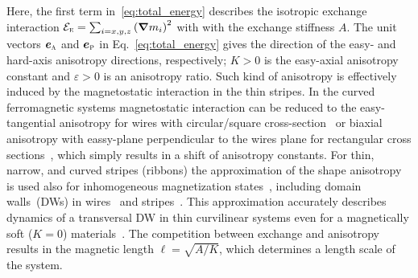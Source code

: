 Here, the first term in~\eqref{eq:total_energy} describes the isotropic exchange interaction $\mathcal{E}_\textsc{e}=\sum_{i=x,y,z}\left(\vec{\nabla} m_i\right)^2$ with with the exchange stiffness $A$. The unit vectors $\vec{e}_\textsc{a}$ and $\vec{e}_\textsc{p}$ in Eq.~\eqref{eq:total_energy} gives the direction of the easy- and hard-axis anisotropy directions, respectively; $K>0$ is the easy-axial anisotropy constant and $\varepsilon>0$ is an anisotropy ratio. Such kind of anisotropy is effectively induced by the magnetostatic interaction in the thin stripes. In the curved ferromagnetic systems magnetostatic interaction can be reduced to the easy-tangential anisotropy for wires with circular/square cross-section~\cite{Slastikov12} or biaxial anisotropy with eassy-plane perpendicular to the wires plane for rectangular cross sections~\cite{Aharoni98,Gaididei17a}, which simply results in a shift of anisotropy constants. For thin, narrow, and curved stripes (ribbons) the approximation of the shape anisotropy is used also for inhomogeneous magnetization states~\cite{Gaididei17a}, including domain walls~(DWs) in wires~\cite{Yershov15b,Yershov16,Pylypovskyi16} and stripes~\cite{Yershov18a,Volkov19c}. This approximation accurately describes dynamics of a transversal DW in thin curvilinear systems even for a magnetically soft ($K = 0$) materials~\cite{Yershov15b,Yershov16,Pylypovskyi16,Yershov18a,Volkov19c}.  The competition between exchange and anisotropy results in the magnetic length $\ell=\sqrt{A/K}$, which determines a length scale of the system.%


